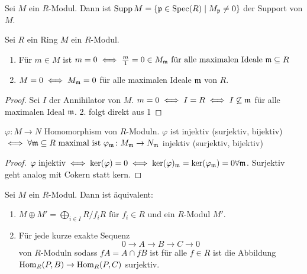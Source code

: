 \begin{Def}
    Sei $M$ ein $R$-Modul. Dann ist $\operatorname{Supp} M=\{\mathfrak{p}\in\operatorname{Spec}(R)\mid M_{\mathfrak{p}}\neq 0\}$ der Support von $M$.
\end{Def}
\begin{Lemma}
    Sei $R$ ein Ring $M$ ein $R$-Modul.
    \begin{enumerate}
        \item Für $m\in M$ ist $m=0\iff \frac m 1=0\in M_{\mathfrak{m}} \text{ für alle maximalen Ideale $\mathfrak{m}\subseteq R$}$
        \item $M=0\iff M_{\mathfrak{m}}=0$ für alle maximalen Ideale $\mathfrak{m}$ von $R$.
    \end{enumerate}
\end{Lemma}
\begin{proof}
    Sei $I$ der Annihilator von $M$.
    $m=0\iff I=R\iff I\not\subseteq \mathfrak{m}$ für alle maximalen Ideal $\mathfrak{m}$.
    2. folgt direkt aus 1
\end{proof}
\begin{Kor}
    $\varphi\colon M\to N$ Homomorphism von $R$-Moduln.
    $\varphi$ ist injektiv (surjektiv, bijektiv) $\iff \forall \mathfrak{m}\subseteq R \text{ maximal ist } \varphi_{\mathfrak{m}}\colon M_{\mathfrak{m}}\to N_{\mathfrak{m}}$ injektiv (surjektiv, bijektiv) 
\end{Kor}
\begin{proof}
    $\varphi \text{ injektiv} \iff \ker(\varphi)=0\iff \ker(\varphi)_{\mathfrak{m}}=\ker(\varphi_{\mathfrak{m}})=0 \forall \mathfrak{m}$. Surjektiv geht analog mit Cokern statt kern.
\end{proof}
\begin{Lemma}
    Sei $M$ ein $R$-Modul. Dann ist äquivalent:
    \begin{enumerate}
        \item $M\oplus M'=\bigoplus_{i\in I}R/f_iR$ für $f_i\in R$ und ein $R$-Modul $M'$.
        \item Für jede kurze exakte Sequenz $$0\to A\to B\to C\to 0$$ von $R$-Moduln sodass $fA=A\cap fB$ ist für alle $f\in R$ ist die Abbildung $\operatorname{Hom}_R(P,B)\to\operatorname{Hom}_R(P,C)$ surjektiv.
    \end{enumerate}
\end{Lemma}
